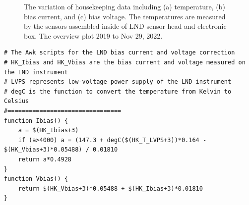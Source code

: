 \begin{figure}[!htb]
    \centering
    \caption[LND temperature, bias current, and bias voltage variations]{The variation of housekeeping data including (a) temperature, (b) bias current, and (c) bias voltage. The temperatures are measured by the sensors assembled inside of LND sensor head and electronic box. The overview plot  2019 to Nov 29, 2022. }
    \label{Fig:appendix_LND_Housekeeping}
\end{figure}



\begin{lstlisting}[float]
# The Awk scripts for the LND bias current and voltage correction
# HK_Ibias and HK_Vbias are the bias current and voltage measured on the LND instrument
# LVPS represents low-voltage power supply of the LND instrument
# degC is the function to convert the temperature from Kelvin to Celsius
#================================
function Ibias() {
    a = $(HK_Ibias+3)
    if (a>4000) a = (147.3 + degC($(HK_T_LVPS+3))*0.164 - $(HK_Vbias+3)*0.05488) / 0.01810
    return a*0.4928
}
function Vbias() {
    return $(HK_Vbias+3)*0.05488 + $(HK_Ibias+3)*0.01810
}

\end{lstlisting}

